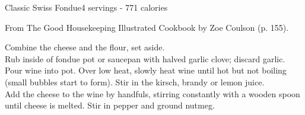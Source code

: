 \begin{recipe}{Classic Swiss Fondue}{4 servings - 771 calories}{}

    \freeform From {\normalfont The Good Housekeeping Illustrated Cookbook} by Zoe Coulson (p. 155).


    Combine the cheese and the flour, set aside.\\

    Rub inside of fondue pot or saucepan with halved garlic clove; discard garlic.\\

    Pour wine into pot. Over low heat, slowly heat wine until hot but not boiling (small bubbles start to form). Stir in the kirsch, brandy or lemon juice.\\

    Add the cheese to the wine by handfuls, stirring constantly with a wooden spoon until cheese is melted. Stir in pepper and ground nutmeg.

\end{recipe}